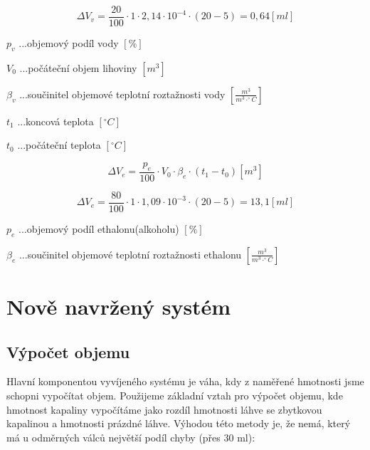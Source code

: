 \[\Delta V_v = \frac{20}{100} \cdot 1 \cdot  2,14 \cdot 10^{-4} \cdot (20 - 5) = 0,64 \left[ml\right]\]

\(p_v\) ...objemový podíl vody \([\%]\) 

\(V_0\) ...počáteční objem lihoviny \([m^3]\)

\(\beta_v\) ...součinitel objemové teplotní roztažnosti vody \([\frac{m^3}{m^3 \cdot ^\circ C}]\)

\(t_1\) ...koncová teplota \([^\circ C]\)

\(t_0\) ...počáteční teplota \([^\circ C]\)

\begin{equation}
    \Delta V_e = \frac{p_e}{100} \cdot V_0 \cdot \beta_e \cdot (t_1 - t_0)\left[m^3\right] \label{objem_kapalina}
\end{equation}

\[\Delta V_e = \frac{80}{100} \cdot 1 \cdot  1,09 \cdot 10^{-3} \cdot (20 - 5) = 13,1 \left[ml\right]\]

\(p_e\) ...objemový podíl ethalonu(alkoholu) \([\%]\) 

\(\beta_e\) ...součinitel objemové teplotní roztažnosti ethalonu \([\frac{m^3}{m^3 \cdot ^\circ C}]\)










\chapter*{Nově navržený systém}



\section{Výpočet objemu}
Hlavní komponentou vyvíjeného systému je váha, kdy z naměřené hmotnosti jsme schopni vypočítat objem. Použijeme základní vztah pro výpočet objemu, kde hmotnost kapaliny vypočítáme jako rozdíl hmotnosti láhve se zbytkovou kapalinou a hmotnosti prázdné láhve. Výhodou této metody je, že nemá, který má u odměrných válců největší podíl chyby (přes 30 ml):

